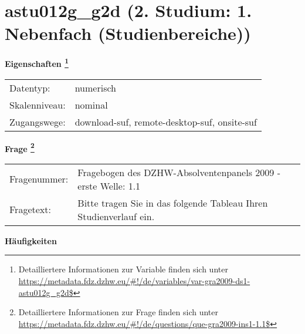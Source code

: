 
    \setcounter{footnote}{0}

    \vspace*{-1.8cm}
	\section{astu012g\_g2d (2. Studium: 1. Nebenfach (Studienbereiche))}
	\label{section:astu012g_g2d}



    \vspace*{0.5cm}
    \noindent\textbf{Eigenschaften
	\footnote{Detailliertere Informationen zur Variable finden sich unter
		\url{https://metadata.fdz.dzhw.eu/\#!/de/variables/var-gra2009-ds1-astu012g_g2d$}}}\\
	\begin{tabularx}{\hsize}{@{}lX}
	Datentyp: & numerisch \\
	Skalenniveau: & nominal \\
	Zugangswege: &
	  download-suf, 
	  remote-desktop-suf, 
	  onsite-suf
 \\
    \end{tabularx}



				\vspace*{0.5cm}
                \noindent\textbf{Frage
	                \footnote{Detailliertere Informationen zur Frage finden sich unter
		              \url{https://metadata.fdz.dzhw.eu/\#!/de/questions/que-gra2009-ins1-1.1$}}}\\
				\begin{tabularx}{\hsize}{@{}lX}
					Fragenummer: &
					  Fragebogen des DZHW-Absolventenpanels 2009 - erste Welle:
					  1.1
 \\
					Fragetext: & Bitte tragen Sie in das folgende Tableau Ihren Studienverlauf ein. \\
				\end{tabularx}





        		\vspace*{0.5cm}
                \noindent\textbf{Häufigkeiten}

